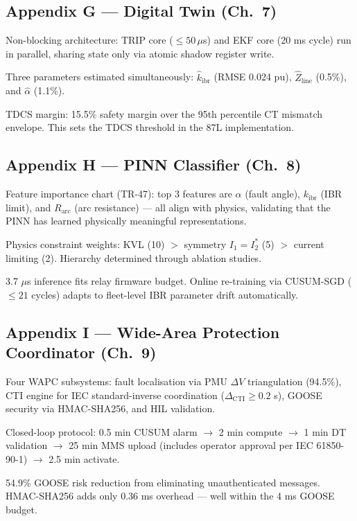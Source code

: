 \documentclass[12pt, a4paper]{article}
\newenvironment{notebox}{%
  \begin{tcolorbox}[
    colback=noteBg,
    colframe=iitmMaroon!40,
    boxrule=0.6pt,
    arc=3pt,
    left=8pt, right=8pt, top=6pt, bottom=6pt
  ]
  \setstretch{1.4}\small
}{%
  \end{tcolorbox}
}
\begin{document}
\subsection*{Appendix G --- Digital Twin (Ch.\ 7)}
\begin{notebox}
Non-blocking architecture: TRIP core ($\leq 50\,\mu$s) and EKF core (20 ms cycle) run
in parallel, sharing state only via atomic shadow register write.

Three parameters estimated simultaneously:
$\hat{k}_\text{ibr}$ (RMSE 0.024 pu), $\hat{Z}_\text{line}$ (0.5\%), and
$\hat{\alpha}$ (1.1\%).

TDCS margin: 15.5\% safety margin over the 95th percentile CT mismatch envelope.
This sets the TDCS threshold in the 87L implementation.
\end{notebox}

\subsection*{Appendix H --- PINN Classifier (Ch.\ 8)}
\begin{notebox}
Feature importance chart (TR-47): top 3 features are $\alpha$ (fault angle),
$k_\text{ibr}$ (IBR limit), and $R_\text{arc}$ (arc resistance) --- all align with
physics, validating that the PINN has learned physically meaningful representations.

Physics constraint weights: KVL (10) $>$ symmetry $I_1 = I_2^*$ (5) $>$ current
limiting (2). Hierarchy determined through ablation studies.

3.7 $\mu$s inference fits relay firmware budget. Online re-training via CUSUM-SGD
($\leq 21$ cycles) adapts to fleet-level IBR parameter drift automatically.
\end{notebox}

\subsection*{Appendix I --- Wide-Area Protection Coordinator (Ch.\ 9)}
\begin{notebox}
Four WAPC subsystems: fault localisation via PMU $\Delta V$ triangulation (94.5\%),
CTI engine for IEC standard-inverse coordination
($\Delta_\text{CTI} \geq 0.2$ s), GOOSE security via HMAC-SHA256, and HIL validation.

Closed-loop protocol: 0.5 min CUSUM alarm $\to$ 2 min compute $\to$ 1 min DT
validation $\to$ 25 min MMS upload (includes operator approval per IEC 61850-90-1)
$\to$ 2.5 min activate.

54.9\% GOOSE risk reduction from eliminating unauthenticated messages.
HMAC-SHA256 adds only 0.36 ms overhead --- well within the 4 ms GOOSE budget.
\end{notebox}
\end{document}
